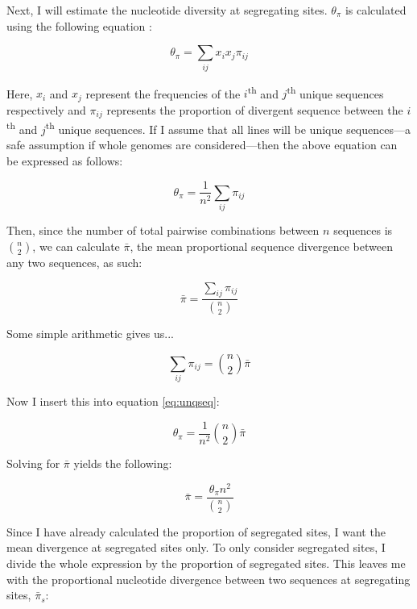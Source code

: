 Next, I will estimate the nucleotide diversity at segregating sites.
$\theta_{\pi}$ is calculated using the following equation \citep{Nei:1979hm}:

\begin{equation} \label{eq:nei}
    \theta_\pi = \sum_{ij} x_i x_j \pi_{ij}
\end{equation}

Here, $x_i$ and $x_j$ represent the frequencies of the $i$\textsuperscript{th} and 
$j$\textsuperscript{th} unique sequences respectively and $\pi_{ij}$ represents the
proportion of divergent sequence between the $i$\textsuperscript{th} and 
$j$\textsuperscript{th} unique sequences.
If I assume that all lines will be unique sequences—a safe assumption if whole
genomes are considered—then the above equation can be expressed as follows:

\begin{equation} \label{eq:unqseq}
    \theta_\pi = \frac{1}{n^2} \sum_{ij} \pi_{ij}
\end{equation}




Then, since the number of total pairwise combinations between $n$ sequences is
${n \choose 2}$, we can calculate $\bar{\pi}$, the mean proportional
sequence divergence between any two sequences, as such:

\begin{equation} \label{eq:barpi}
    \bar{\pi} = \frac{ \sum_{ij} \pi_{ij} }{ {n \choose 2} }
\end{equation}

Some simple arithmetic gives us...

\begin{equation} \label{eq:sumij}
    \sum_{ij} \pi_{ij} = {n \choose 2} \bar{\pi}
\end{equation}

Now I insert this into equation \ref{eq:unqseq}:

\begin{equation} \label{eq:insbpi}
    \theta_\pi = \frac{1}{n^2} {n \choose 2} \bar{\pi}
\end{equation}

Solving for $\bar{\pi}$ yields the following:

\begin{equation} \label{eq:solvebarpi}
    \bar{\pi} = \frac{\theta_\pi n^2}{{n \choose 2}}
\end{equation}


Since I have already calculated the proportion of segregated sites, I want the mean
divergence at segregated sites only.
To only consider segregated sites, I divide the whole expression by the proportion 
of segregated sites.
This leaves me with the proportional nucleotide divergence between two sequences
at segregating sites, $\bar{\pi}_{s}$:

